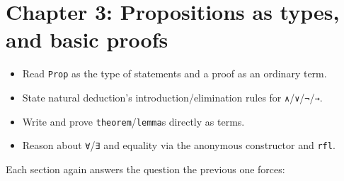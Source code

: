 \chapter{Chapter 3: Propositions as types, and basic proofs}\label{sec:03-propositions-and-proofs:00-index:1}

\begin{learningobjectives}
\begin{itemize}
\tightlist
\item
  Read \texttt{Prop} as the type of statements and a proof as an ordinary term.
\item
  State natural deduction's introduction/elimination rules for \texttt{∧}/\texttt{∨}/\texttt{¬}/\texttt{→}.
\item
  Write and prove \texttt{theorem}/\texttt{lemma}s directly as terms.
\item
  Reason about \texttt{∀}/\texttt{∃} and equality via the anonymous constructor and \texttt{rfl}.
\end{itemize}
\end{learningobjectives}


Each section again answers the question the previous one forces:

